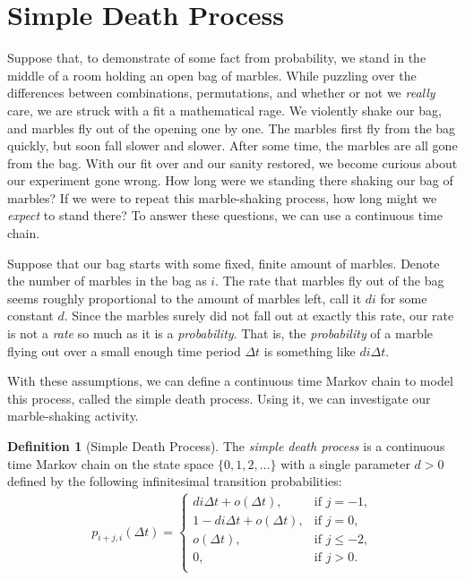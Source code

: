 \documentclass[12pt]{article}
\theoremstyle{definition}
\newtheorem{defn}{Definition}
\begin{document}
\section{Simple Death Process}
\label{sec:simple_death_process}

Suppose that, to demonstrate of some fact from probability, we stand in the
middle of a room holding an open bag of marbles. While puzzling over the
differences between combinations, permutations, and whether or not we
\emph{really} care, we are struck with a fit a mathematical rage. We violently
shake our bag, and marbles fly out of the opening one by one. The marbles first
fly from the bag quickly, but soon fall slower and slower.  After some time,
the marbles are all gone from the bag. With our fit over and our sanity
restored, we become curious about our experiment gone wrong. How long were we
standing there shaking our bag of marbles? If we were to repeat this
marble-shaking process, how long might we \emph{expect} to stand there? To
answer these questions, we can use a continuous time chain.

Suppose that our bag starts with some fixed, finite amount of marbles. Denote
the number of marbles in the bag as $i$. The rate that marbles fly out of the
bag seems roughly proportional to the amount of marbles left, call it $di$ for
some constant $d$. Since the marbles surely did not fall out at exactly this
rate, our rate is not a \emph{rate} so much as it is a \emph{probability}.
That is, the \emph{probability} of a marble flying out over a small enough time
period $\Delta t$ is something like $di \Delta t$.

With these assumptions, we can define a continuous time Markov chain to model
this process, called the simple death process. Using it, we can investigate our
marble-shaking activity.

\begin{defn}[Simple Death Process]
The \emph{simple death process} is a continuous time Markov chain on the state
space $\{0, 1, 2, \dots\}$ with a single parameter $d > 0$ defined by the
following infinitesimal transition probabilities:
\begin{align*}
    p_{i + j, i}(\Delta t) =
    \begin{cases}
        di \Delta t + o(\Delta t), & \text{if } j = -1, \\
        1 - di \Delta t + o(\Delta t), & \text{if } j = 0, \\
        o(\Delta t), & \text{if } j \leq -2, \\
        0, & \text{if } j > 0. \\
    \end{cases}
\end{align*}
\end{defn}
\end{document}
